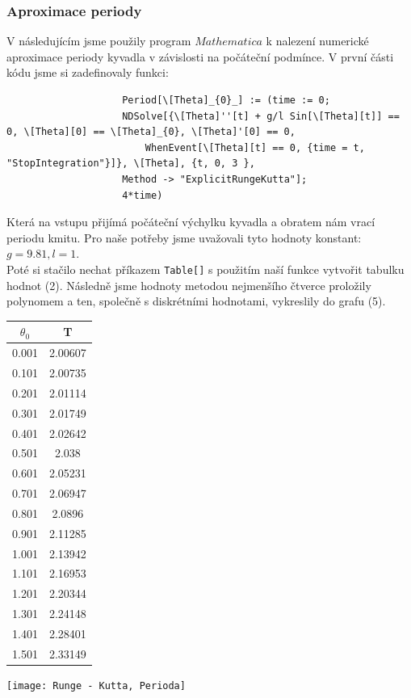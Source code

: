 \documentclass[reqno, a4paper]{amsart}
\begin{document}
				\subsubsection{Aproximace periody}
				\label{sec:aprox-periody}
				V následujícím jsme použily program $Mathematica$ k nalezení numerické aproximace periody kyvadla v závislosti na počáteční podmínce.
				V první části kódu jsme si zadefinovaly funkci:
				\begin{verbatim}
					Period[\[Theta]_{0}_] := (time := 0; 
					NDSolve[{\[Theta]''[t] + g/l Sin[\[Theta][t]] == 0, \[Theta][0] == \[Theta]_{0}, \[Theta]'[0] == 0, 
						WhenEvent[\[Theta][t] == 0, {time = t, "StopIntegration"}]}, \[Theta], {t, 0, 3 },
					Method -> "ExplicitRungeKutta"];
					4*time)
				\end{verbatim}
				Která na vstupu přijímá počáteční výchylku kyvadla a obratem nám vrací periodu kmitu. Pro naše potřeby jsme uvažovali tyto hodnoty konstant: $g=9.81, l=1$.\\
				Poté si stačilo nechat příkazem \verb|Table[]| s použitím naší funkce vytvořit tabulku hodnot (2). Následně jsme hodnoty metodou nejmenšího čtverce proložily polynomem a ten, společně s diskrétními hodnotami, vykreslily do grafu (5).\\
				\begin{minipage}{\textwidth}
					\begin{minipage}[b]{0.25\textwidth}
						\centering
						\begin{tabular}{|c|c|}
							\hline
							$\theta_{0}$ & T \\ 
							\hline
							0.001& 2.00607\\0.101& 2.00735\\0.201& 2.01114\\0.301& 2.01749\\0.401& 2.02642\\0.501& 2.038\\0.601& 2.05231\\0.701& 2.06947\\0.801& 2.0896\\0.901& 2.11285\\1.001& 2.13942
							\\1.101& 2.16953\\1.201& 2.20344\\1.301& 2.24148\\1.401& 2.28401\\1.501& 2.33149\\
							\hline
						\end{tabular}
					\end{minipage}
					\begin{minipage}[b]{0.79\textwidth}
						\centering
						\texttt{[image: Runge - Kutta, Perioda]}
					\end{minipage}
					\hfill
				\end{minipage}
				\clearpage
\end{document}
